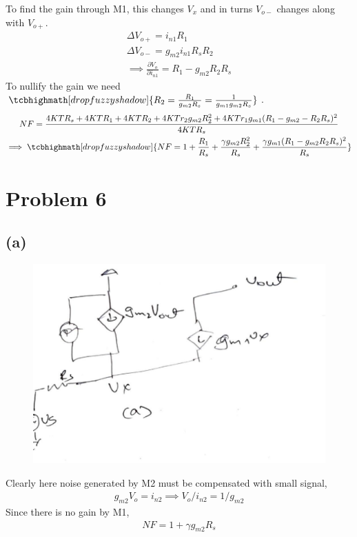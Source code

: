 \documentclass{article}
\begin{document}
To find the gain through M1, this changes $V_x$ and in turns $V_{o-}$ changes along with $V_{o+}$.
\begin{gather*}
	\Delta V_{o+} = i_{n1}R_1\\
	\Delta V_{o-} = g_{m2}i_{n1}R_sR_2\\
	\implies \frac{\partial V_o}{\partial i_{n1}} = R_1 - g_{m2}R_2R_s
\end{gather*}
To nullify the gain we need $\tcbhighmath[drop fuzzy shadow]{R_2 = \frac{R_1}{g_{m2}R_s} = \frac{1}{g_{m1}g_{m2}R_s}}$.
\begin{gather*}
	NF = \frac{4KTR_s + 4KTR_1 + 4KTR_2 + 4KTr_2g_{m2}R_2^2 + 4KTr_1g_{m1}(R_1 - g_{m2}-R_2R_s)^2}{4KTR_s}\\
	\implies \tcbhighmath[drop fuzzy shadow]{NF = 1 + \frac{R_1}{R_s} + \frac{\gamma g_{m2}R_2^2}{R_s} + \frac{\gamma g_{m1}(R_1 - g_{m2}R_2R_s)^2}{R_s}}
\end{gather*}
\section*{\hfil Problem 6}
\subsection*{(a)}
\begin{figure}[H]
	\centering
	\includegraphics[scale=0.25]{./figs/q6a.jpeg}
\end{figure}
Clearly here noise generated by M2 must be compensated with small signal,\\
\begin{gather*}
	g_{m2}V_{o} = i_{n2} \implies V_{o}/i_{n2}=1/g_{m2}
\end{gather*}
Since there is no gain by M1,
\begin{gather*}
	NF = 1 + \gamma g_{m2}R_s
\end{gather*}
\end{document}

